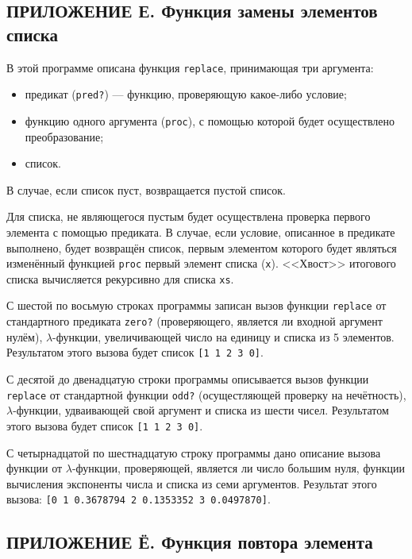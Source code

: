     \subsection*{ПРИЛОЖЕНИЕ Е. Функция замены элементов списка}
    

    В этой программе описана функция \verb,replace,, принимающая три аргумента:
    \begin{itemize}
        \item предикат (\verb,pred?,) --- функцию, проверяющую какое-либо условие;
        \item функцию одного аргумента (\verb,proc,), с помощью которой будет осуществлено преобразование;
        \item список.
    \end{itemize}

    В случае, если список пуст, возвращается пустой список.

    Для списка, не являющегося пустым будет осуществлена проверка первого элемента с помощью предиката.
    В случае, если условие, описанное в предикате выполнено, будет возвращён список, первым элементом которого будет являться изменённый функцией \verb,proc, первый элемент списка (\verb,x,).
    <<Хвост>> итогового списка вычисляется рекурсивно для списка \verb,xs,.

    С шестой по восьмую строках программы записан вызов функции \verb,replace, от стандартного предиката \verb,zero?, (проверяющего, является ли входной аргумент нулём), $\lambda$-функции, увеличивающей число на единицу и списка из 5 элементов.
    Результатом этого вызова будет список \verb,[1 1 2 3 0],.

    С десятой до двенадцатую строки программы описывается вызов функции \verb,replace, от стандартной функции \verb,odd?, (осущестляющей проверку на нечётность), $\lambda$-функции, удваивающей свой аргумент и списка из шести чисел.
    Результатом этого вызова будет список \verb,[1 1 2 3 0],.

    С четырнадцатой по шестнадцатую строку программы дано описание вызова функции от $\lambda$-функции, проверяющей, является ли число большим нуля, функции вычисления экспоненты числа и списка из семи аргументов.
    Результат этого вызова: \verb,[0 1 0.3678794 2 0.1353352 3 0.0497870],.

    \subsection*{ПРИЛОЖЕНИЕ Ё. Функция повтора элемента}
    

